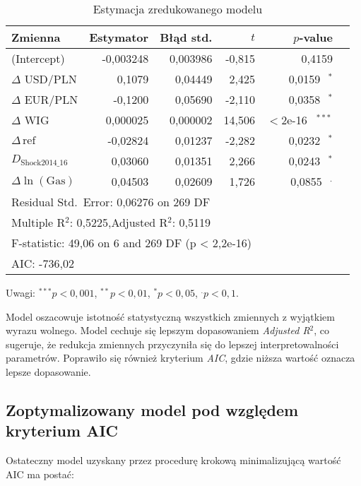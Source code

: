 \documentclass[12pt, twoside]{article}
\begin{document}
\begin{table}[ht]
  \centering
  \caption{Estymacja zredukowanego modelu}
  \label{tab:reduced_model}
  \begin{tabular}{lrrrrr}
    \toprule
    Zmienna & Estymator & Błąd std. & $t$ & $p$-value & \\
    \midrule
    (Intercept)               & -0,003248 & 0,003986 & -0,815  & 0,4159 & \\
    $\Delta$ USD/PLN         &  0,1079   & 0,04449  &  2,425  & 0,0159$^{\quad*}$ & \\
    $\Delta$ EUR/PLN         & -0,1200   & 0,05690  & -2,110  & 0,0358$^{\quad*}$ & \\
    $\Delta$ WIG             &  0,000025 & 0,000002 & 14,506  & $<$2e-16$^{\quad***}$ & \\
    $\Delta\,\mathrm{ref}$      & -0,02824 & 0,01237  & -2,282  & 0,0232$^{\quad*}$ & \\
    $D_{\mathrm{Shock2014\_16}}$ &  0,03060 & 0,01351  &  2,266  & 0,0243$^{\quad*}$ & \\
    $\Delta\ln(\mathrm{Gas})$   &  0,04503 & 0,02609  &  1,726  & 0,0855$^{\quad.}$ & \\
    \midrule
    \multicolumn{6}{l}{Residual Std.\ Error: 0,06276 on 269 DF} \\
    \multicolumn{6}{l}{Multiple R$^2$: 0,5225,\quad Adjusted R$^2$: 0,5119} \\
    \multicolumn{6}{l}{F-statistic: 49,06 on 6 and 269 DF (p < 2,2e-16)} \\
    \multicolumn{6}{l}{AIC: -736,02} \\
    \bottomrule
  \end{tabular}
  \begin{tablenotes}
    \small
    \item Uwagi: $^{***}p<0{,}001$, $^{**}p<0{,}01$, $^{*}p<0{,}05$, $^{.}p<0{,}1$.
  \end{tablenotes}
\end{table}


Model oszacowuje istotność statystyczną wszystkich zmiennych z wyjątkiem wyrazu wolnego. Model cechuje się lepszym dopasowaniem \textit{Adjusted R$^2$}, co sugeruje, że redukcja zmiennych przyczyniła się do lepszej interpretowalności parametrów. Poprawiło się również kryterium \textit{AIC}, gdzie niższa wartość oznacza lepsze dopasowanie.

\subsection*{Zoptymalizowany model pod względem kryterium AIC}
Ostateczny model uzyskany przez procedurę krokową minimalizującą wartość AIC ma postać:
\end{document}
